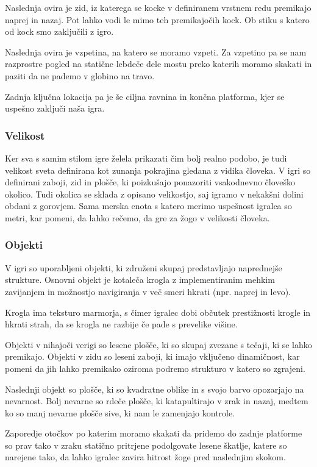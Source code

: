 \documentclass[a4paper]{article}
\begin{document}
Naslednja ovira je zid, iz katerega se kocke v definiranem vrstnem redu premikajo naprej in nazaj. Pot lahko vodi le mimo teh premikajočih kock. Ob stiku s katero od kock smo zaključili z igro. 

Naslednja ovira je vzpetina, na katero se moramo vzpeti. Za vzpetino pa se nam razprostre pogled na statične lebdeče dele mostu preko katerih moramo skakati in paziti da ne pademo v globino na travo. 

Zadnja ključna lokacija pa je še ciljna ravnina in končna platforma, kjer se uspešno zaključi naša igra.

\subsubsection{Velikost}
Ker sva s samim stilom igre želela prikazati čim bolj realno podobo, je tudi velikost sveta definirana kot zunanja pokrajina gledana z vidika človeka. V igri so definirani zaboji, zid in plošče, ki poizkušajo ponazoriti vsakodnevno človeško okolico. Tudi okolica se sklada z opisano velikostjo, saj igramo v nekakšni dolini obdani z gorovjem. Sama merska enota s katero merimo uspešnost igralca so metri, kar pomeni, da lahko rečemo, da gre za žogo v velikosti človeka.

\subsubsection{Objekti}
V igri so uporabljeni objekti, ki združeni skupaj predstavljajo naprednejše strukture. Osnovni objekt je kotaleča krogla z implementiranim mehkim zavijanjem in možnostjo navigiranja v več smeri hkrati (npr. naprej in levo).

Krogla ima teksturo marmorja, s čimer igralec dobi občutek prestižnosti krogle in hkrati strah, da se krogla ne razbije če pade s prevelike višine.  

Objekti v nihajoči verigi so lesene plošče, ki so skupaj zvezane s tečaji, ki se lahko premikajo. 
Objekti v zidu so leseni zaboji, ki imajo vključeno dinamičnost, kar pomeni da jih lahko premikako oziroma podremo strukturo v katero so zgrajeni. 

Naslednji objekt so plošče, ki so kvadratne oblike in s svojo barvo opozarjajo na nevarnost. Bolj nevarne so rdeče plošče, ki katapultirajo v zrak in nazaj, medtem ko so manj nevarne plošče sive, ki nam le zamenjajo kontrole. 

Zaporedje otočkov po katerim moramo skakati da pridemo do zadnje platforme so prav tako v zraku statično pritrjene podolgovate lesene škatlje, katere so narejene tako, da lahko igralec zavira hitrost žoge pred naslednjim skokom.
\end{document}
